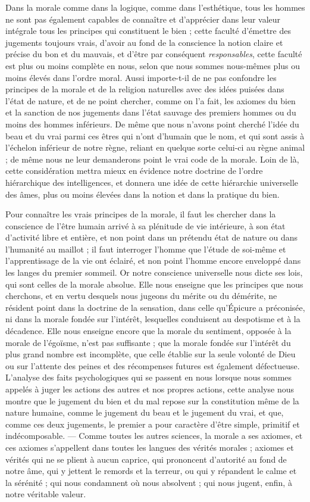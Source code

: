 \documentclass[a4paper, 11pt, oneside]{article}
\begin{document}
Dans la morale comme dans la logique, comme dans l'esthétique, tous les hommes ne sont pas également capables de connaître et d'apprécier dans leur valeur intégrale tous les principes qui constituent le bien ; cette faculté d'émettre des jugements toujours vrais, d'avoir au fond de la conscience la notion claire et précise du bon et du mauvais, et d'être par conséquent \emph{responsables}, cette faculté est plus ou moins complète en nous, selon que nous sommes nous-mêmes plus ou moins élevés dans l'ordre moral. Aussi importe-t-il de ne pas confondre les principes de la morale et de la religion naturelles avec des idées puisées dans l'état de nature, et de ne point chercher, comme on l'a fait, les axiomes du bien et la sanction de nos jugements dans l'état sauvage des premiers hommes ou du moins des hommes inférieurs. De même que nous n'avons point cherché l'idée du beau et du vrai parmi ces êtres qui n'ont d'humain que le nom, et qui sont assis à l'échelon inférieur de notre règne, reliant en quelque sorte celui-ci au règne animal ; de même nous ne leur demanderons point le vrai code de la morale. Loin de là, cette considération mettra mieux en évidence notre doctrine de l'ordre hiérarchique des intelligences, et donnera une idée de cette hiérarchie universelle des âmes, plus ou moins élevées dans la notion et dans la pratique du bien.

Pour connaître les vrais principes de la morale, il faut les chercher dans la conscience de l'être humain arrivé à sa plénitude de vie intérieure, à son état d'activité libre et entière, et non point dans un prétendu état de nature ou dans l'humanité au maillot ; il faut interroger l'homme que l'étude de soi-même et l'apprentissage de la vie ont éclairé, et non point l'homme encore enveloppé dans les langes du premier sommeil. Or notre conscience universelle nous dicte ses lois, qui sont celles de la morale absolue. Elle nous enseigne que les principes que nous cherchons, et en vertu desquels nous jugeons du mérite ou du démérite, ne résident point dans la doctrine de la sensation, dans celle qu'Épicure a préconisée, ni dans la morale fondée sur l'intérêt, lesquelles conduisent au despotisme et à la décadence. Elle nous enseigne encore que la morale du sentiment, opposée à la morale de l'égoïsme, n'est pas suffisante ; que la morale fondée sur l'intérêt du plus grand nombre est incomplète, que celle établie sur la seule volonté de Dieu ou sur l'attente des peines et des récompenses futures est également défectueuse. L'analyse des faits psychologiques qui se passent en nous lorsque nous sommes appelés à juger les actions des autres et nos propres actions, cette analyse nous montre que le jugement du bien et du mal repose sur la constitution même de la nature humaine, comme le jugement du beau et le jugement du vrai, et que, comme ces deux jugements, le premier a pour caractère d'être simple, primitif et indécomposable. --- Comme toutes les autres sciences, la morale a ses axiomes, et ces axiomes s'appellent dans toutes les langues des vérités morales ; axiomes et vérités qui ne se plient à aucun caprice, qui prononcent d'autorité au fond de notre âme, qui y jettent le remords et la terreur, ou qui y répandent le calme et la sérénité ; qui nous condamnent où nous absolvent ; qui nous jugent, enfin, à notre véritable valeur.
\end{document}

